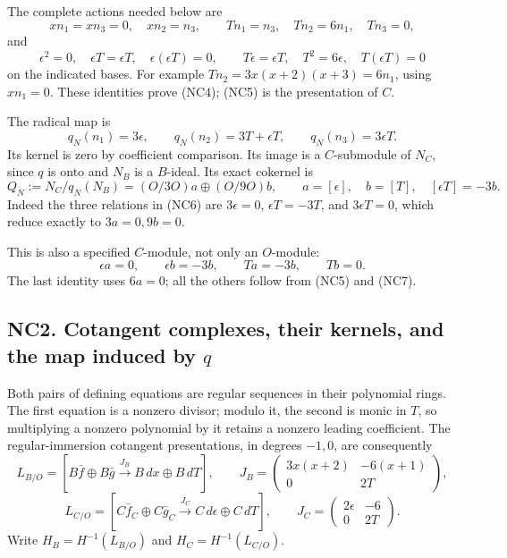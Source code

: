 \documentclass[
]{article}
\begin{document}
The complete actions needed below are \[
xn_1=xn_3=0,\quad xn_2=n_3,\qquad
Tn_1=n_3,\quad Tn_2=6n_1,\quad Tn_3=0,
\tag{NC4}
\] and \[
\epsilon^2=0,\quad \epsilon T=\epsilon T,\quad
\epsilon(\epsilon T)=0,\qquad
T\epsilon=\epsilon T,\quad T^2=6\epsilon,\quad T(\epsilon T)=0
\tag{NC5}
\] on the indicated bases. For example \(Tn_2=3x(x+2)(x+3)=6n_1\), using
\(xn_1=0\). These identities prove (NC4); (NC5) is the presentation of
\(C\).

The radical map is \[
q_N(n_1)=3\epsilon,\qquad
q_N(n_2)=3T+\epsilon T,\qquad
q_N(n_3)=3\epsilon T.
\tag{NC6}
\] Its kernel is zero by coefficient comparison. Its image is a
\(C\)-submodule of \(N_C\), since \(q\) is onto and \(N_B\) is a
\(B\)-ideal. Its exact cokernel is \[
Q_N:=N_C/q_N(N_B)
=(O/3O)a\oplus(O/9O)b,\qquad
a=[\epsilon],\quad b=[T],\quad[\epsilon T]=-3b.
\tag{NC7}
\] Indeed the three relations in (NC6) are \(3\epsilon=0\),
\(\epsilon T=-3T\), and \(3\epsilon T=0\), which reduce exactly to
\(3a=0,9b=0\).

This is also a specified \(C\)-module, not only an \(O\)-module: \[
\epsilon a=0,\qquad \epsilon b=-3b,\qquad
Ta=-3b,\qquad Tb=0.
\tag{NC8}
\] The last identity uses \(6a=0\); all the others follow from (NC5) and
(NC7).

\subsection{\texorpdfstring{NC2. Cotangent complexes, their kernels, and
the map induced by
\(q\)}{NC2. Cotangent complexes, their kernels, and the map induced by q}}\label{nc2.-cotangent-complexes-their-kernels-and-the-map-induced-by-q}

Both pairs of defining equations are regular sequences in their
polynomial rings. The first equation is a nonzero divisor; modulo it,
the second is monic in \(T\), so multiplying a nonzero polynomial by it
retains a nonzero leading coefficient. The regular-immersion cotangent
presentations, in degrees \(-1,0\), are consequently \[
L_{B/O}=
\left[B\bar f\oplus B\bar g
\xrightarrow{J_B}B\,dx\oplus B\,dT\right],
\qquad
J_B=
\begin{pmatrix}3x(x+2)&-6(x+1)\\0&2T\end{pmatrix},
\] \[
L_{C/O}=
\left[C\bar f_C\oplus C\bar g_C
\xrightarrow{J_C}C\,d\epsilon\oplus C\,dT\right],
\qquad
J_C=
\begin{pmatrix}2\epsilon&-6\\0&2T\end{pmatrix}.
\tag{NC9}
\] Write \(H_B=H^{-1}(L_{B/O})\) and \(H_C=H^{-1}(L_{C/O})\).
\end{document}
